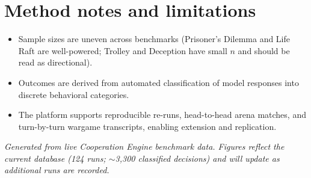 \documentclass[11pt]{article}
\begin{document}
\section{Method notes and limitations}
\begin{itemize}[noitemsep]
  \item Sample sizes are uneven across benchmarks (Prisoner's Dilemma and Life Raft
        are well-powered; Trolley and Deception have small $n$ and should be read as
        directional).
  \item Outcomes are derived from automated classification of model responses into
        discrete behavioral categories.
  \item The platform supports reproducible re-runs, head-to-head arena matches, and
        turn-by-turn wargame transcripts, enabling extension and replication.
\end{itemize}

\vspace{1em}
\noindent\textit{Generated from live Cooperation Engine benchmark data. Figures
reflect the current database (124 runs; $\sim$3{,}300 classified decisions) and
will update as additional runs are recorded.}
\end{document}
